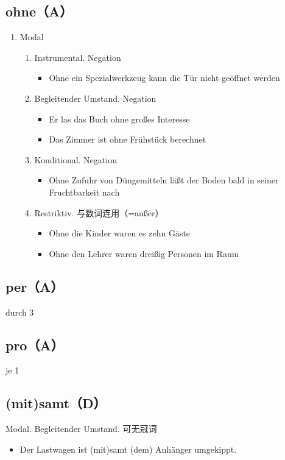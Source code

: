 \documentclass[UTF8]{report}
\begin{document}
\subsection{ohne（A）}
\begin{enumerate}
    \item Modal
    \begin{enumerate}
        \item Instrumental. Negation
        \begin{itemize}
            \item Ohne ein Spezialwerkzeug kann die Tür nicht geöffnet werden
        \end{itemize}
        \item Begleitender Umstand. Negation
        \begin{itemize}
            \item Er las das Buch ohne großes Interesse
            \item Das Zimmer ist ohne Frühstück berechnet
        \end{itemize}
        \item Konditional. Negation
        \begin{itemize}
            \item Ohne Zufuhr von Düngemitteln läßt der Boden bald in seiner Fruchtbarkeit nach
        \end{itemize}
        \item Restriktiv. 与数词连用（=außer）
        \begin{itemize}
            \item Ohne die Kinder waren es zehn Gäste
            \item Ohne den Lehrer waren dreißig Personen im Raum
        \end{itemize}
    \end{enumerate}
\end{enumerate}

\subsection{per（A）}
durch 3
\subsection{pro（A）}
je 1


\subsection{(mit)samt（D）}
Modal. Begleitender Umstand. 可无冠词
\begin{itemize}
    \item Der Lastwagen ist (mit)samt (dem) Anhänger umgekippt.
\end{itemize}
\end{document}
